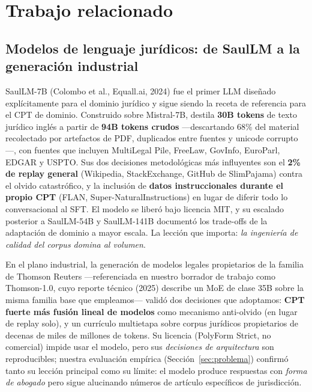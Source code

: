 \section{Trabajo relacionado}\label{sec:relacionado}

\subsection{Modelos de lenguaje jurídicos: de SaulLM a la generación industrial}

SaulLM-7B (Colombo et al., Equall.ai, 2024) fue el primer LLM diseñado explícitamente para el dominio jurídico y sigue siendo la receta de referencia para el CPT de dominio.\cite{colombo2024} Construido sobre Mistral-7B, destila \textbf{30B tokens} de texto jurídico inglés a partir de \textbf{94B tokens crudos} ---descartando 68\% del material recolectado por artefactos de PDF, duplicados entre fuentes y unicode corrupto---, con fuentes que incluyen MultiLegal Pile, FreeLaw, GovInfo, EuroParl, EDGAR y USPTO. Sus dos decisiones metodológicas más influyentes son el \textbf{2\% de replay general} (Wikipedia, StackExchange, GitHub de SlimPajama) contra el olvido catastrófico, y la inclusión de \textbf{datos instruccionales durante el propio CPT} (FLAN, Super-NaturalInstructions) en lugar de diferir todo lo conversacional al SFT. El modelo se liberó bajo licencia MIT, y su escalado posterior a SaulLM-54B y SaulLM-141B documentó los trade-offs de la adaptación de dominio a mayor escala.\cite{saullm54b} La lección que importa: \emph{la ingeniería de calidad del corpus domina al volumen}.

En el plano industrial, la generación de modelos legales propietarios de la familia de Thomson Reuters ---referenciada en nuestro borrador de trabajo como Thomson-1.0, cuyo reporte técnico (2025) describe un MoE de clase 35B sobre la misma familia base que empleamos--- validó dos decisiones que adoptamos: \textbf{CPT fuerte más fusión lineal de modelos} como mecanismo anti-olvido (en lugar de replay solo), y un currículo multietapa sobre corpus jurídicos propietarios de decenas de miles de millones de tokens. Su licencia (PolyForm Strict, no comercial) impide usar el modelo, pero sus \emph{decisiones de arquitectura} son reproducibles; nuestra evaluación empírica (Sección~\ref{sec:problema}) confirmó tanto su lección principal como su límite: el modelo produce respuestas con \emph{forma de abogado} pero sigue alucinando números de artículo específicos de jurisdicción.

